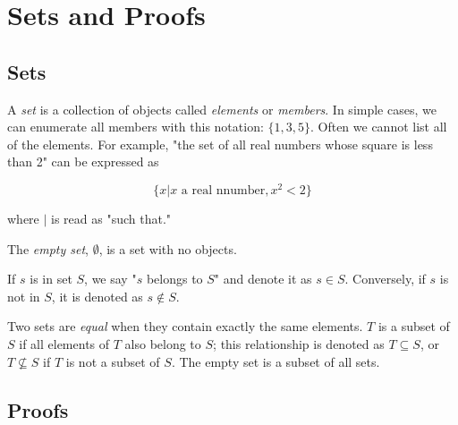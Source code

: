 \section{Sets and Proofs}

\subsection{Sets}

A \textit{set} is a collection of objects called \textit{elements} or \textit{members}.
In simple cases, we can enumerate all members with this notation: $\{1, 3, 5\}$.
Often we cannot list all of the elements.
For example, "the set of all real numbers whose square is less than 2" can be expressed as

$$
\{x | x \text{ a real nnumber}, x^2 < 2\}
$$

\noindent where $|$ is read as "such that."

The \textit{empty set}, $\emptyset$, is a set with no objects.

If $s$ is in set $S$, we say "$s$ belongs to $S$" and denote it as $s \in S$.
Conversely, if $s$ is not in $S$, it is denoted as $s \notin S$.

Two sets are \textit{equal} when they contain exactly the same elements.
$T$ is a subset of $S$ if all elements of $T$ also belong to $S$; this relationship is denoted as $T \subseteq S$, or $T \nsubseteq S$ if $T$ is not a subset of $S$.
The empty set is a subset of all sets.

\subsection{Proofs}
